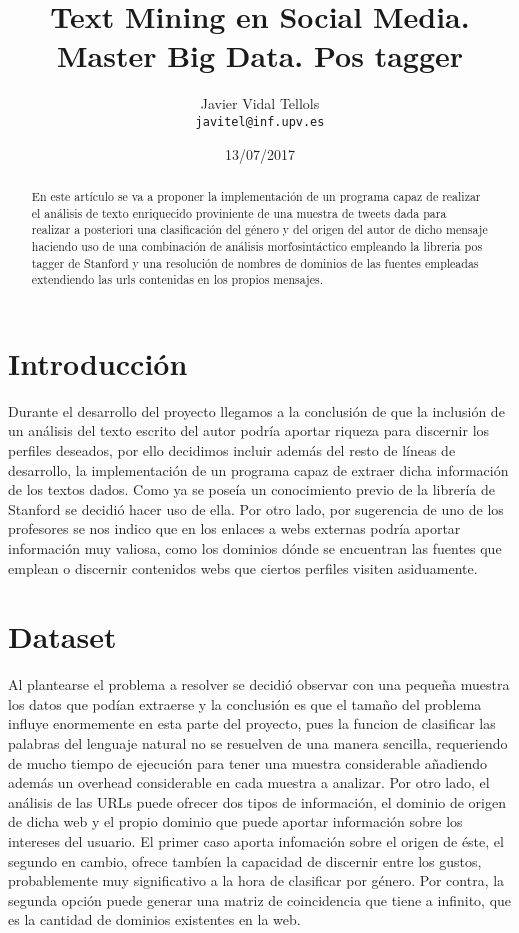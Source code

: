 \documentclass[11pt,a4paper]{article}
\title{Text Mining en Social Media. Master Big Data. Pos tagger}
\author{Javier Vidal Tellols \\
  {\tt javitel@inf.upv.es} \\}
\date{13/07/2017}
\begin{document}
\maketitle
\begin{abstract}
En este artículo se va a proponer la implementación de un programa capaz de realizar el análisis de texto enriquecido proviniente de una muestra de tweets dada para realizar a posteriori una clasificación del género y del origen del autor de dicho mensaje haciendo uso de una combinación de análisis morfosintáctico empleando la libreria pos tagger de Stanford y una resolución de nombres de dominios de las fuentes empleadas extendiendo las urls contenidas en los propios mensajes.\end{abstract}


\section{Introducción}

Durante el desarrollo del proyecto llegamos a la conclusión de que la inclusión de un análisis del texto escrito del autor podría aportar riqueza para discernir los perfiles deseados, por ello decidimos incluir además del resto de líneas de desarrollo, la implementación de un programa capaz de extraer dicha información de los textos dados. Como ya se poseía un conocimiento previo de la librería de Stanford se decidió hacer uso de ella. Por otro lado, por sugerencia de uno de los profesores se nos indico que en los enlaces a webs externas podría aportar información muy valiosa, como los dominios dónde se encuentran las fuentes que emplean o discernir contenidos webs que ciertos perfiles visiten asiduamente.


\section{Dataset}

Al plantearse el problema a resolver se decidió observar con una pequeña muestra los datos que podían extraerse y la conclusión es que el tamaño del problema influye enormemente en esta parte del proyecto, pues la funcion de clasificar las palabras del lenguaje natural no se resuelven de una manera sencilla, requeriendo de mucho tiempo de ejecución para tener una muestra considerable añadiendo además un overhead considerable en cada muestra a analizar. Por otro lado, el análisis de las URLs puede ofrecer dos tipos de información, el dominio de origen de dicha web y el propio dominio que puede aportar información sobre los intereses del usuario. El primer caso aporta infomación sobre el origen de éste, el segundo en cambio, ofrece tambíen la capacidad de discernir entre los gustos, probablemente muy significativo a la hora de clasificar por género. Por contra, la segunda opción puede generar una matriz de coincidencia que tiene a infinito, que es la cantidad de dominios existentes en la web.
\end{document}
